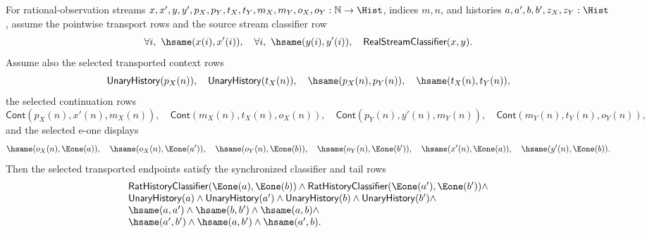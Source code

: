 \begin{theorem}
\label{thm:real-selected-transport-synchronized-e1-endpoints}
For rational-observation streams
$x,x',y,y',p_X,p_Y,t_X,t_Y,m_X,m_Y,o_X,o_Y:\mathbb{N}\to\Hist$,
indices $m,n$, and histories $a,a',b,b',z_X,z_Y:\Hist$, assume the pointwise
transport rows and the source stream classifier row
$$
\forall i,\ \hsame(x(i),x'(i)),\quad
\forall i,\ \hsame(y(i),y'(i)),\quad
\mathsf{RealStreamClassifier}(x,y).
$$
Assume also the selected transported context rows
$$
\mathsf{UnaryHistory}(p_X(n)),\quad
\mathsf{UnaryHistory}(t_X(n)),\quad
\hsame(p_X(n),p_Y(n)),\quad
\hsame(t_X(n),t_Y(n)),
$$
the selected continuation rows
$$
\mathsf{Cont}(p_X(n),x'(n),m_X(n)),\quad
\mathsf{Cont}(m_X(n),t_X(n),o_X(n)),
\quad\mathsf{Cont}(p_Y(n),y'(n),m_Y(n)),\quad
\mathsf{Cont}(m_Y(n),t_Y(n),o_Y(n)),
$$
and the selected e-one displays
$$
\hsame(o_X(n),\Eone(a)),\quad
\hsame(o_X(n),\Eone(a')),\quad
\hsame(o_Y(n),\Eone(b)),\quad
\hsame(o_Y(n),\Eone(b')),\quad
\hsame(x'(n),\Eone(a)),\quad
\hsame(y'(n),\Eone(b)).
$$
Then the selected transported endpoints satisfy the synchronized classifier and
tail rows
$$
\begin{array}{l}
\mathsf{RatHistoryClassifier}(\Eone(a),\Eone(b))\land
\mathsf{RatHistoryClassifier}(\Eone(a'),\Eone(b'))\land\\
\mathsf{UnaryHistory}(a)\land
\mathsf{UnaryHistory}(a')\land
\mathsf{UnaryHistory}(b)\land
\mathsf{UnaryHistory}(b')\land\\
\hsame(a,a')\land \hsame(b,b')\land \hsame(a,b)\land\\
\hsame(a',b')\land \hsame(a,b')\land \hsame(a',b).
\end{array}
$$
\end{theorem}
